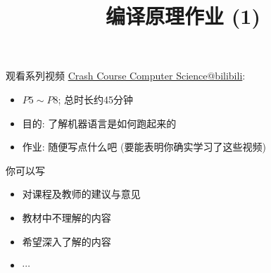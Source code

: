 \documentclass[a4paper, justified]{tufte-handout}
\title{编译原理作业 (1)}
\date{\zhtoday} %
\begin{document}
\maketitle
\noplagiarism %
\begin{abstract}
\end{abstract}

\begin{problem}
  观看系列视频 \href{https://www.bilibili.com/video/BV1EW411u7th?}{Crash Course Computer Science@bilibili}:
  \begin{itemize}
    \item $P5 \sim P8$; 总时长约45分钟
    \item 目的: 了解机器语言是如何跑起来的
    \item 作业: 随便写点什么吧 (要能表明你确实学习了这些视频)
  \end{itemize}
\end{problem}

\begin{solution}
\end{solution}

\begin{problem}[]
\end{problem}

\begin{solution}
\end{solution}

\begin{problem}[]
\end{problem}

\begin{solution}
\end{solution}

\begin{problem}[]
\end{problem}

\begin{solution}
\end{solution}



\beginfb

你可以写
\begin{itemize}
  \item 对课程及教师的建议与意见
  \item 教材中不理解的内容
  \item 希望深入了解的内容
  \item $\cdots$
\end{itemize}
\end{document}
